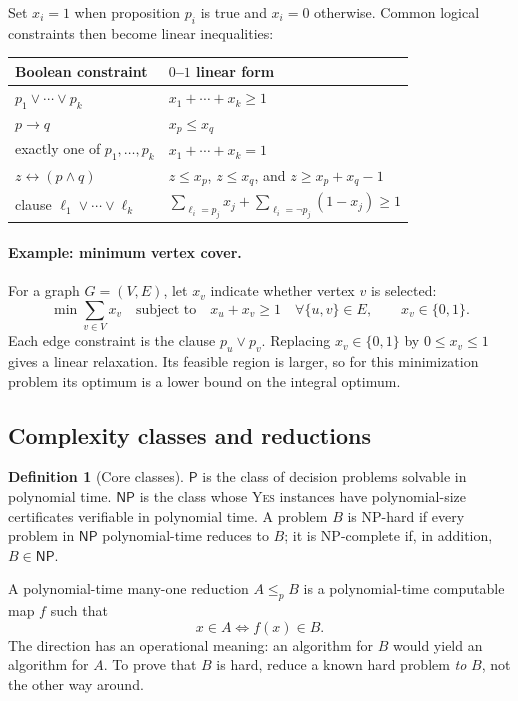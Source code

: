 \documentclass[10pt]{article}
\theoremstyle{definition}
\newtheorem{definition}{Definition}[section]
\newcommand{\YES}{\textsc{Yes}}
\newcommand{\NP}{\mathsf{NP}}
\newcommand{\PTIME}{\mathsf{P}}
\begin{document}
Set $x_i=1$ when proposition $p_i$ is true and $x_i=0$ otherwise.  Common
logical constraints then become linear inequalities:

\begin{center}
\begin{tabular}{P{0.36\textwidth}P{0.43\textwidth}}
\toprule
Boolean constraint & $0$--$1$ linear form \\
\midrule
$p_1\lor\cdots\lor p_k$
  & $x_1+\cdots+x_k\ge1$ \\
$p\rightarrow q$
  & $x_p\le x_q$ \\
exactly one of $p_1,\ldots,p_k$
  & $x_1+\cdots+x_k=1$ \\
$z\leftrightarrow(p\land q)$
  & $z\le x_p$, $z\le x_q$, and $z\ge x_p+x_q-1$ \\
clause $\ell_1\lor\cdots\lor\ell_k$
  & $\sum_{\ell_i=p_j}x_j+\sum_{\ell_i=\neg p_j}(1-x_j)\ge1$ \\
\bottomrule
\end{tabular}
\end{center}

\paragraph{Example: minimum vertex cover.}
For a graph $G=(V,E)$, let $x_v$ indicate whether vertex $v$ is selected:
\[
  \min\sum_{v\in V}x_v
  \quad\text{subject to}\quad
  x_u+x_v\ge1\quad\forall\{u,v\}\in E,
  \qquad x_v\in\{0,1\}.
\]
Each edge constraint is the clause $p_u\lor p_v$.  Replacing
$x_v\in\{0,1\}$ by $0\le x_v\le1$ gives a linear relaxation.  Its feasible
region is larger, so for this minimization problem its optimum is a lower
bound on the integral optimum.

\subsection{Complexity classes and reductions}

\begin{definition}[Core classes]
$\PTIME$ is the class of decision problems solvable in polynomial time.
$\NP$ is the class whose \YES{} instances have polynomial-size certificates
verifiable in polynomial time.  A problem $B$ is NP-hard if every problem in
$\NP$ polynomial-time reduces to $B$; it is NP-complete if, in addition,
$B\in\NP$.
\end{definition}

A polynomial-time many-one reduction $A\le_p B$ is a polynomial-time
computable map $f$ such that
\[
  x\in A\iff f(x)\in B.
\]
The direction has an operational meaning: an algorithm for $B$ would yield an
algorithm for $A$.  To prove that $B$ is hard, reduce a known hard problem
\emph{to} $B$, not the other way around.
\end{document}
